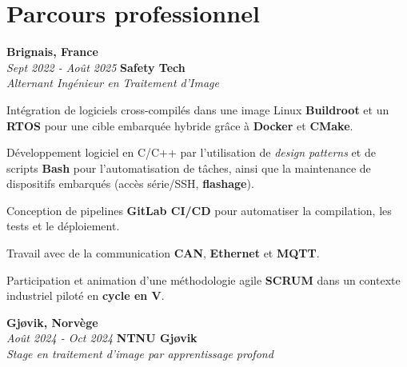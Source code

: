 
    \section{Parcours professionnel}
        \begin{twocolentry}{
			\textbf{Brignais, France} \\
			\textit{Sept 2022 - Août 2025}
            }{
            \textbf{Safety Tech} \\
            \textit{Alternant Ingénieur en Traitement d'Image}
            }
        \end{twocolentry}

        \begin{onecolentry}
            \begin{highlights}
                \item Intégration de logiciels cross-compilés dans une image Linux \textbf{Buildroot} et un \textbf{RTOS} pour une cible embarquée hybride grâce à \textbf{Docker} et \textbf{CMake}.
                \item Développement logiciel en C/C++ par l'utilisation de \textit{design patterns} et de scripts \textbf{Bash} pour l'automatisation de tâches, ainsi que la maintenance de dispositifs embarqués (accès série/SSH, \textbf{flashage}).
                \item Conception de pipelines \textbf{GitLab CI/CD} pour automatiser la compilation, les tests et le déploiement.
                \item Travail avec de la communication \textbf{CAN}, \textbf{Ethernet} et \textbf{MQTT}.
                \item Participation et animation d'une méthodologie agile \textbf{SCRUM} dans un contexte industriel piloté en \textbf{cycle en V}.
            \end{highlights}
        \end{onecolentry}

        \begin{twocolentry}{
			\textbf{Gjøvik, Norvège} \\
			\textit{Août 2024 - Oct 2024}
            }{
			\textbf{NTNU Gjøvik} \\
			\textit{Stage en traitement d'image par apprentissage profond}
            }
        \end{twocolentry}

